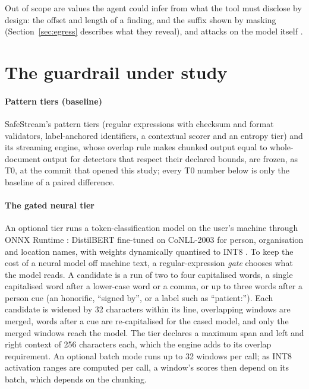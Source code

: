 \documentclass[conference]{IEEEtran}
\begin{document}
Out of scope are values the agent could infer from what the tool must disclose by design: the offset and length of a finding, and the suffix shown by masking (Section~\ref{sec:egress} describes what they reveal), and attacks on the model itself \cite{carlini2021extracting,lukas2023pii}.

\section{The guardrail under study}\label{sec:system}

\paragraph{Pattern tiers (baseline)} SafeStream's pattern tiers (regular expressions with checksum and format validators, label-anchored identifiers, a contextual scorer and an entropy tier) and its streaming engine, whose overlap rule makes chunked output equal to whole-document output for detectors that respect their declared bounds, are frozen, as T0, at the commit that opened this study; every T0 number below is only the baseline of a paired difference.

\paragraph{The gated neural tier} An optional tier runs a token-classification model on the user's machine through ONNX Runtime \cite{onnxruntime}: DistilBERT \cite{sanh2019distilbert} fine-tuned on CoNLL-2003 \cite{tjongkimsang2003conll} for person, organisation and location names, with weights dynamically quantised to INT8 \cite{jacob2018quantization}. To keep the cost of a neural model off machine text, a regular-expression \emph{gate} chooses what the model reads. A candidate is a run of two to four capitalised words, a single capitalised word after a lower-case word or a comma, or up to three words after a person cue (an honorific, ``signed by'', or a label such as ``patient:''). Each candidate is widened by 32 characters within its line, overlapping windows are merged, words after a cue are re-capitalised for the cased model, and only the merged windows reach the model. The tier declares a maximum span and left and right context of 256 characters each, which the engine adds to its overlap requirement. An optional batch mode runs up to 32 windows per call; as INT8 activation ranges are computed per call, a window's scores then depend on its batch, which depends on the chunking.
\end{document}

